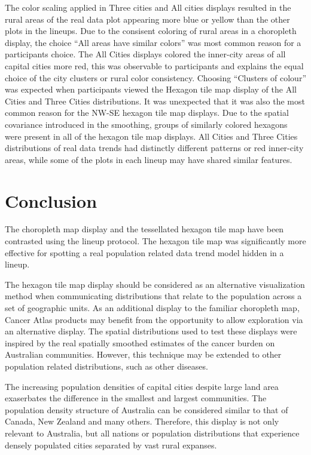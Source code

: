 \documentclass[conference,final,]{IEEEtran}
\begin{document}
The color scaling applied in Three cities and All cities displays resulted in the rural areas of the real data plot appearing more blue or yellow than the other plots in the lineups.
Due to the consisent coloring of rural areas in a choropleth display, the choice ``All areas have similar colors'' was most common reason for a participants choice. The All Cities displays colored the inner-city areas of all capital cities more red, this was observable to participants and explains the equal choice of the city clusters or rural color consistency.
Choosing ``Clusters of colour'' was expected when participants viewed the Hexagon tile map display of the All Cities and Three Cities distributions. It was unexpected that it was also the most common reason for the NW-SE hexagon tile map displays.
Due to the spatial covariance introduced in the smoothing, groups of similarly colored hexagons were present in all of the hexagon tile map displays. All Cities and Three Cities distributions of real data trends had distinctly different patterns or red inner-city areas, while some of the plots in each lineup may have shared similar features.

\hypertarget{conclusion}{%
\section{Conclusion}\label{conclusion}}

The choropleth map display and the tessellated hexagon tile map have been contrasted using the lineup protocol. The hexagon tile map was significantly more effective for spotting a real population related data trend model hidden in a lineup.

The hexagon tile map display should be considered as an alternative visualization method when communicating distributions that relate to the population across a set of geographic units. As an additional display to the familiar choropleth map, Cancer Atlas products may benefit from the opportunity to allow exploration via an alternative display. The spatial distributions used to test these displays were inspired by the real spatially smoothed estimates of the cancer burden on Australian communities. However, this technique may be extended to other population related distributions, such as other diseases.

The increasing population densities of capital cities despite large land area exaserbates the difference in the smallest and largest communities.
The population density structure of Australia can be considered similar to that of Canada, New Zealand and many others. Therefore, this display is not only relevant to Australia, but all nations or population distributions that experience densely populated cities separated by vast rural expanses.
\end{document}
